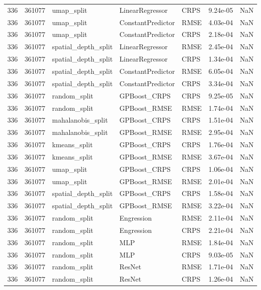 \begin{tabular}{rrlllrr}
336 & 361077 & umap\_split & LinearRegressor & CRPS & 9.24e-05 & NaN \\
336 & 361077 & umap\_split & ConstantPredictor & RMSE & 4.03e-04 & NaN \\
336 & 361077 & umap\_split & ConstantPredictor & CRPS & 2.18e-04 & NaN \\
336 & 361077 & spatial\_depth\_split & LinearRegressor & RMSE & 2.45e-04 & NaN \\
336 & 361077 & spatial\_depth\_split & LinearRegressor & CRPS & 1.34e-04 & NaN \\
336 & 361077 & spatial\_depth\_split & ConstantPredictor & RMSE & 6.05e-04 & NaN \\
336 & 361077 & spatial\_depth\_split & ConstantPredictor & CRPS & 3.34e-04 & NaN \\
336 & 361077 & random\_split & GPBoost\_CRPS & CRPS & 9.25e-05 & NaN \\
336 & 361077 & random\_split & GPBoost\_RMSE & RMSE & 1.74e-04 & NaN \\
336 & 361077 & mahalanobis\_split & GPBoost\_CRPS & CRPS & 1.51e-04 & NaN \\
336 & 361077 & mahalanobis\_split & GPBoost\_RMSE & RMSE & 2.95e-04 & NaN \\
336 & 361077 & kmeans\_split & GPBoost\_CRPS & CRPS & 1.76e-04 & NaN \\
336 & 361077 & kmeans\_split & GPBoost\_RMSE & RMSE & 3.67e-04 & NaN \\
336 & 361077 & umap\_split & GPBoost\_CRPS & CRPS & 1.06e-04 & NaN \\
336 & 361077 & umap\_split & GPBoost\_RMSE & RMSE & 2.01e-04 & NaN \\
336 & 361077 & spatial\_depth\_split & GPBoost\_CRPS & CRPS & 1.58e-04 & NaN \\
336 & 361077 & spatial\_depth\_split & GPBoost\_RMSE & RMSE & 3.22e-04 & NaN \\
336 & 361077 & random\_split & Engression & RMSE & 2.11e-04 & NaN \\
336 & 361077 & random\_split & Engression & CRPS & 2.21e-04 & NaN \\
336 & 361077 & random\_split & MLP & RMSE & 1.84e-04 & NaN \\
336 & 361077 & random\_split & MLP & CRPS & 9.03e-05 & NaN \\
336 & 361077 & random\_split & ResNet & RMSE & 1.71e-04 & NaN \\
336 & 361077 & random\_split & ResNet & CRPS & 1.26e-04 & NaN \\

\end{tabular}
